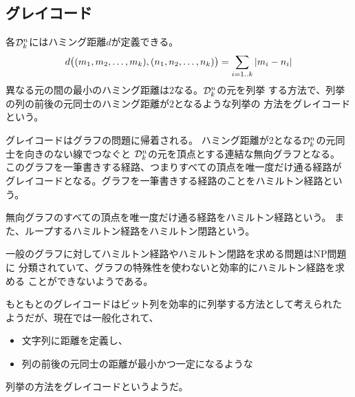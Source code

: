 \subsection{グレイコード}\label{s2:グレイコード} %
	各${\mathcal{D}}_k^n$にはハミング距離$d$が定義できる。
	\begin{equation*}\begin{split} %
		d\bigl((m_1,m_2,\dots,m_k),(n_1,n_2,\dots,n_k)\bigr)
		= \sum_{i=1..k}\zettai{m_i-n_i}
	\end{split}\end{equation*} %
	異なる元の間の最小のハミング距離は$2$なる。${\mathcal{D}}_k^n$の元を列挙
	する方法で、列挙の列の前後の元同士のハミング距離が$2$となるような列挙の
	方法をグレイコードという。

	グレイコードはグラフの問題に帰着される。
	ハミング距離が$2$となる${\mathcal{D}}_k^n$の元同士を向きのない線でつなぐと
	${\mathcal{D}}_k^n$の元を頂点とする連結な無向グラフとなる。
	このグラフを一筆書きする経路、つまりすべての頂点を唯一度だけ通る経路が
	グレイコードとなる。グラフを一筆書きする経路のことをハミルトン経路という。

	\begin{definition}[ハミルトン経路]\label{def:ハミルトン経路} %
		無向グラフのすべての頂点を唯一度だけ通る経路をハミルトン経路という。
		また、ループするハミルトン経路をハミルトン閉路という。
	\end{definition} %

	一般のグラフに対してハミルトン経路やハミルトン閉路を求める問題はNP問題に
	分類されていて、グラフの特殊性を使わないと効率的にハミルトン経路を求める
	ことができないようである。

	もともとのグレイコードはビット列を効率的に列挙する方法として考えられた
	ようだが、現在では一般化されて、
	\begin{itemize}\setlength{\itemsep}{-1mm} %
		\item 文字列に距離を定義し、
		\item 列の前後の元同士の距離が最小かつ一定になるような
	\end{itemize} %
	列挙の方法をグレイコードというようだ。

